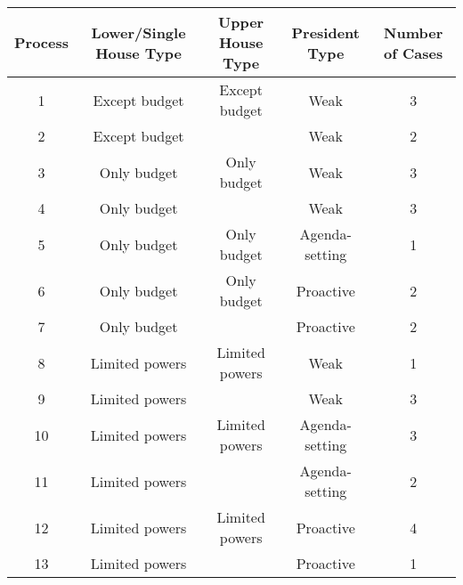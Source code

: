 \documentclass{article}
\begin{document}
\begin{landscape}
\begin{center}

\begin{tabular}{ccccc}
\hline
Process&Lower/Single House Type&Upper House Type&President Type&Number of Cases\\
\hline
1&Except budget&Except budget&Weak&3\\
2&Except budget&&Weak&2\\
3&Only budget&Only budget&Weak&3\\
4&Only budget&&Weak&3\\
5&Only budget&Only budget&Agenda-setting&1\\
6&Only budget&Only budget&Proactive&2\\
7&Only budget&&Proactive&2\\
8&Limited powers&Limited powers&Weak&1\\
9&Limited powers&&Weak&3\\
10&Limited powers&Limited powers&Agenda-setting&3\\
11&Limited powers&&Agenda-setting&2\\
12&Limited powers&Limited powers&Proactive&4\\
13&Limited powers&&Proactive&1\\
\end{tabular}

\end{center}
\end{landscape}
\end{document}
